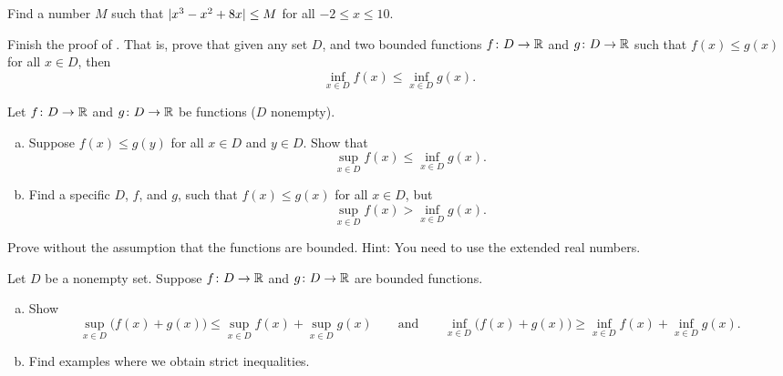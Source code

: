 \begin{exercise}
Find a number $M$ such that $\lvert {x^3-x^2+8x} \rvert \leq M$ for all $-2 \leq x \leq
10$.
\end{exercise}

\begin{exercise}
Finish the proof of .
That is, prove that
given any set $D$,
and two bounded functions
$f \colon D \to {\mathbb{R}}$ and $g \colon D \to {\mathbb{R}}$ 
such that $f(x) \leq g(x)$ for all $x \in D$, then 
\begin{equation*}
\inf_{x\in D} f(x) \leq \inf_{x\in D} g(x) .
\end{equation*}
\end{exercise}

\begin{exercise}
Let 
$f \colon D \to {\mathbb{R}}$ and $g \colon D \to {\mathbb{R}}$ be functions ($D$ nonempty).
\begin{enumerate}[a)]
%
\item
Suppose 
$f(x) \leq g(y)$ for all $x \in D$ and $y \in D$.  Show that
\begin{equation*}
\sup_{x\in D} f(x) \leq \inf_{x\in D} g(x) .
\end{equation*}
%
\item
Find a specific $D$, $f$, and $g$, such that
$f(x) \leq g(x)$ for all $x \in D$, but
\begin{equation*}
\sup_{x\in D} f(x) > \inf_{x\in D} g(x) .
\end{equation*}
\end{enumerate}
\end{exercise}

\begin{exercise}
Prove  without the assumption that
the functions are bounded.  Hint: You need to use the extended real
numbers.
\end{exercise}

\begin{exercise} \label{exercise:sumofsup}
Let $D$ be a nonempty set.
Suppose $f \colon D \to {\mathbb{R}}$ and $g \colon D \to {\mathbb{R}}$ are bounded functions.
\begin{enumerate}[a)]
\item
Show 
\begin{equation*}
\sup_{x\in D} \bigl(f(x) + g(x) \bigr) \leq
\sup_{x\in D} f(x)
+
\sup_{x\in D} g(x)
\qquad \text{and} \qquad
\inf_{x\in D} \bigl(f(x) + g(x) \bigr) \geq
\inf_{x\in D} f(x)
+
\inf_{x\in D} g(x) .
\end{equation*}
\item
Find examples where we obtain strict inequalities.
\end{enumerate}
\end{exercise}

